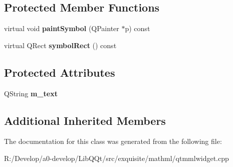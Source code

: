 \subsection*{Protected Member Functions}
\begin{DoxyCompactItemize}
\item 
\mbox{\label{class_mml_text_node_a1f285c9aa54aee253a08e670b01abdec}} 
virtual void {\bfseries paint\+Symbol} (Q\+Painter $\ast$p) const
\item 
\mbox{\label{class_mml_text_node_a152cfe571cbdc38937c8ae1878eb21ec}} 
virtual Q\+Rect {\bfseries symbol\+Rect} () const
\end{DoxyCompactItemize}
\subsection*{Protected Attributes}
\begin{DoxyCompactItemize}
\item 
\mbox{\label{class_mml_text_node_a57d89674ed98e0f80c598c75761b71e0}} 
Q\+String {\bfseries m\+\_\+text}
\end{DoxyCompactItemize}
\subsection*{Additional Inherited Members}


The documentation for this class was generated from the following file\+:\begin{DoxyCompactItemize}
\item 
R\+:/\+Develop/a0-\/develop/\+Lib\+Q\+Qt/src/exquisite/mathml/qtmmlwidget.\+cpp\end{DoxyCompactItemize}
